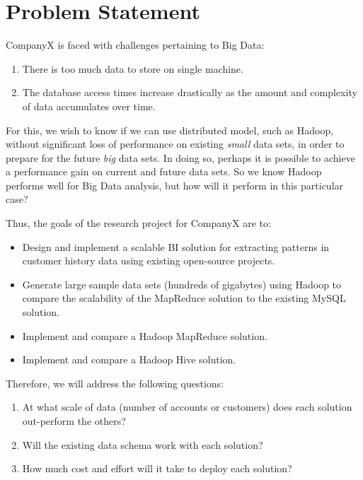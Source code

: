 \section{Problem Statement}
CompanyX is faced with challenges pertaining to Big Data:
\begin{enumerate}
 \item There is too much data to store on single machine.
 \item The database access times increase drastically as the amount and complexity of data accumulates over time.
\end{enumerate}
For this, we wish to know if we can use distributed model, such as Hadoop, without significant loss of performance on existing \textit{small} data sets, in order to prepare for the future \textit{big} data sets. In doing so, perhaps it is possible to achieve a performance gain on current and future data sets. So we know Hadoop performs well for Big Data analysis, but how will it perform in this particular case?

Thus, the goals of the research project for CompanyX are to:
\begin{itemize}
  \item Design and implement a scalable BI solution for extracting patterns in customer history data using existing open-source projects.
  \item Generate large sample data sets (hundreds of gigabytes) using Hadoop to compare the scalability of the MapReduce solution to the existing MySQL solution.
  \item Implement and compare a Hadoop MapReduce solution.
  \item Implement and compare a Hadoop Hive solution.
\end{itemize}
Therefore, we will address the following questions:
\begin{enumerate}
 \item At what scale of data (number of accounts or customers) does each solution out-perform the others?
 \item Will the existing data schema work with each solution?
 \item How much cost and effort will it take to deploy each solution?
\end{enumerate}